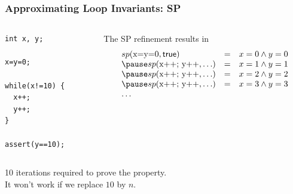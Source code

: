 
\begin{frame}[fragile]
\frametitle{Approximating Loop Invariants: SP}

\begin{columns}
\begin{column}{.3\textwidth}
\begin{lstlisting}
int x, y;

x=y=0;

while(x!=10) {
  x++;
  y++;
}

assert(y==10);
\end{lstlisting}
\end{column}
\begin{column}{.6\textwidth}
The SP refinement results in
%
\[ \begin{array}{lll}
sp(\lstinline!x=y=0!, \textsf{true}) &=& x=0 \land y=0 \\
\pause
sp(\lstinline!x++; y++!, \ldots) &=& x=1 \land y=1 \\
\pause
sp(\lstinline!x++; y++!, \ldots) &=& x=2 \land y=2 \\
\pause
sp(\lstinline!x++; y++!, \ldots) &=& x=3 \land y=3 \\
\ldots
\end{array} \]
\end{column}
\end{columns}
\vfill

\myfail{} 10 iterations required to prove the property.\\
\myfail{} It won't work if we replace $10$ by $n$.

\end{frame}


